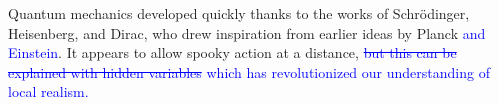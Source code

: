 \documentclass[11pt]{article}\usepackage[paperwidth=14cm,paperheight=7cm,left=1cm,right=3.6cm,top=1cm,bottom=1cm,marginparwidth=2.6cm,marginparsep=3mm]{geometry}\pagestyle{empty}
\begin{document}
Quantum mechanics developed quickly thanks to the works of Schr\"odinger, Heisenberg, and Dirac, who drew inspiration from earlier ideas by Planck \textcolor{blue}{and Einstein}. It appears to allow spooky action at a distance, \textcolor{blue}{\sout{but this can be explained with hidden variables}} \textcolor{blue}{which has revolutionized our understanding of local realism.}
\end{document}
